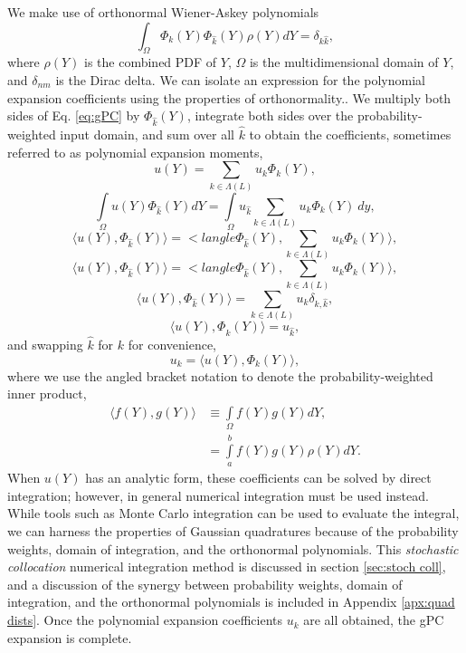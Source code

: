 We make use of orthonormal Wiener-Askey polynomials
\begin{equation}
  \int_\Omega \Phi_k(Y)\Phi_{\hat k}(Y) \rho(Y) dY = \delta_{k\hat k},
\end{equation}
where $\rho(Y)$ is the combined PDF of $Y$, $\Omega$ is the multidimensional domain of $Y$, and $\delta_{nm}$
is the Dirac delta.  We can isolate an expression for the polynomial expansion coefficients using the
properties of orthonormality..
We multiply both sides of Eq. \ref{eq:gPC} by
$\Phi_{\hat k}(Y)$, integrate both sides over the probability-weighted input domain, and sum over all $\hat k$
to obtain the coefficients, sometimes referred to as polynomial expansion moments,
\begin{equation}
  u(Y) = \sum_{k\in\Lambda(L)} u_k\Phi_k(Y),
\end{equation}
\begin{equation}
  \int\limits_\Omega u(Y)\Phi_{\hat k}(Y) dY = \int\limits_\Omega u_{\hat k} \sum_{k\in\Lambda(L)}
           u_k\Phi_k(Y)\ dy,
\end{equation}
\begin{equation}
  \langle u(Y),\Phi_{\hat k}(Y)\rangle = <langle \Phi_{\hat k}(Y),\sum_{k\in\Lambda(L)}
           u_k\Phi_k(Y) \rangle,
\end{equation}
\begin{equation}
  \langle u(Y),\Phi_{\hat k}(Y)\rangle = <langle \Phi_{\hat k}(Y),\sum_{k\in\Lambda(L)}
           u_k\Phi_k(Y) \rangle,
\end{equation}
\begin{equation}
  \langle u(Y),\Phi_{\hat k}(Y)\rangle = \sum_{k\in\Lambda(L)} u_k \delta_{k,\hat k},
\end{equation}
\begin{equation}
  \langle u(Y),\Phi_{\hat k}(Y)\rangle = u_{\hat k} ,
\end{equation}
and swapping $\hat k$ for $k$ for convenience,
\begin{equation}\label{eq:polycoeff}
  u_k = \langle u(Y),\Phi_k(Y) \rangle,
\end{equation}
where we use the angled bracket notation to denote the probability-weighted inner product,
\begin{align}
  \langle f(Y),g(Y) \rangle &\equiv \int\limits_\Omega f(Y)g(Y) dY, \\
    &= \int\limits_a^b f(Y)g(Y)\rho(Y) dY.
\end{align}
When $u(Y)$ has an analytic form, these coefficients can be solved by direct integration; however, in general
numerical integration must be used instead.  While tools such as Monte Carlo integration can
be used to evaluate the integral, we can harness the properties of Gaussian quadratures because of the
probability weights, domain of integration, and the orthonormal polynomials.
This \emph{stochastic collocation} numerical integration method is discussed in section \ref{sec:stoch
coll}, and a discussion of the synergy between probability weights, domain of integration, and the 
orthonormal polynomials is included in Appendix \ref{apx:quad dists}.  Once the polynomial expansion 
coefficients $u_k$ are all obtained, the gPC expansion is complete.

